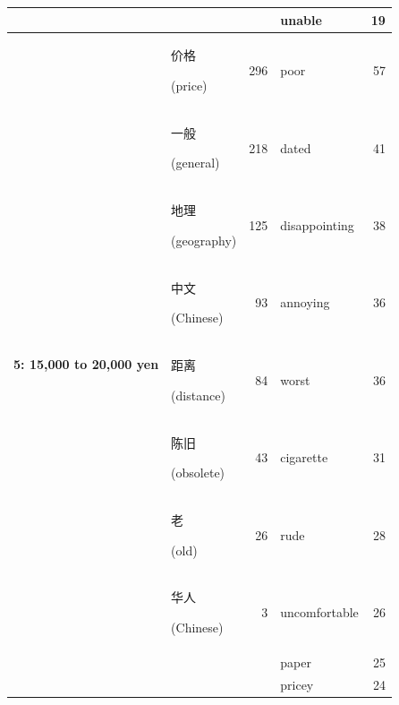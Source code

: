 \documentclass[smallextended,natbib]{svjour3}       %
\begin{document}
\begin{table}[ht]
{\begin{tabular}{|c|lr|lr|}
                                                             &                                                &      & unable         & 19  \\ \hline
        \multirow{10}{*}{\textbf{5: 15,000 to 20,000 yen}}   & \begin{CJK}{UTF8}{gbsn}价格\end{CJK} (price)     & 296  & poor           & 57  \\  
                                                             & \begin{CJK}{UTF8}{gbsn}一般\end{CJK} (general)   & 218  & dated          & 41  \\  
                                                             & \begin{CJK}{UTF8}{gbsn}地理\end{CJK} (geography) & 125  & disappointing  & 38  \\  
                                                             & \begin{CJK}{UTF8}{gbsn}中文\end{CJK} (Chinese)   & 93   & annoying       & 36  \\  
                                                             & \begin{CJK}{UTF8}{gbsn}距离\end{CJK} (distance)  & 84   & worst          & 36  \\  
                                                             & \begin{CJK}{UTF8}{gbsn}陈旧\end{CJK} (obsolete)  & 43   & cigarette      & 31  \\  
                                                             & \begin{CJK}{UTF8}{gbsn}老\end{CJK} (old)        & 26   & rude           & 28  \\  
                                                             & \begin{CJK}{UTF8}{gbsn}华人\end{CJK} (Chinese)   & 3    & uncomfortable  & 26  \\  
                                                             &                                                &      & paper          & 25  \\  
                                                             &                                                &      & pricey         & 24  \\ \hline

\end{tabular}}
\end{table}
\end{document}
